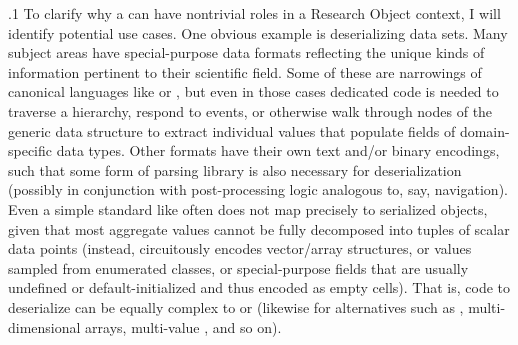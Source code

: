\documentclass[11pt, twocolumn]{article}
\begin{document}
\p.1{%
To clarify why a  can have nontrivial roles in a Research Object context, I will
identify potential  use cases. One obvious example is deserializing data sets.
Many subject areas have special-purpose data formats reflecting the unique kinds of
information pertinent to their scientific field. Some of these are narrowings of
canonical languages like  or , but even in those cases dedicated code is
needed to traverse a  hierarchy, respond to  events, or otherwise
walk through nodes of the generic data structure to extract individual values that
populate fields of domain-specific data types. Other formats have their
own text and/or binary encodings, such that some form of parsing library is also
necessary for deserialization (possibly in conjunction with post-processing logic analogous
to, say,  navigation). Even a simple standard like  often does not map precisely
to serialized objects, given that most aggregate values cannot be fully decomposed
into tuples of scalar data points (instead,  circuitously encodes vector/array
structures, or values sampled from enumerated classes, or special-purpose fields
that are usually undefined or default-initialized and thus encoded as empty cells).
That is, code to deserialize  can be equally complex to  or  (likewise for
alternatives such as , multi-dimensional arrays, multi-value , and so on).
}%
\end{document}
